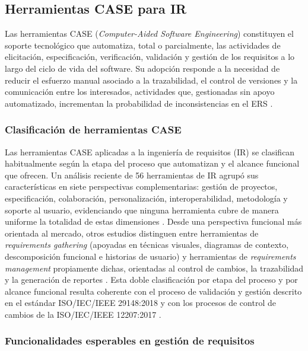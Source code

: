 \documentclass[journal,onecolumn]{IEEEtran}
\begin{document}
	\subsection{Herramientas CASE para IR}
	
	Las herramientas CASE (\textit{Computer-Aided Software Engineering}) constituyen el soporte tecnológico que automatiza, total o parcialmente, las actividades de elicitación, especificación, verificación, validación y gestión de los requisitos a lo largo del ciclo de vida del software. Su adopción responde a la necesidad de reducir el esfuerzo manual asociado a la trazabilidad, el control de versiones y la comunicación entre los interesados, actividades que, gestionadas sin apoyo automatizado, incrementan la probabilidad de inconsistencias en el ERS \cite{ISO29148-2018}.
	
	\subsubsection{Clasificación de herramientas CASE}
	
	Las herramientas CASE aplicadas a la ingeniería de requisitos (IR) se clasifican habitualmente según la etapa del proceso que automatizan y el alcance funcional que ofrecen. Un análisis reciente de 56 herramientas de IR agrupó sus características en siete perspectivas complementarias: gestión de proyectos, especificación, colaboración, personalización, interoperabilidad, metodología y soporte al usuario, evidenciando que ninguna herramienta cubre de manera uniforme la totalidad de estas dimensiones \cite{Ozkaya2023}. Desde una perspectiva funcional más orientada al mercado, otros estudios distinguen entre herramientas de \textit{requirements gathering} (apoyadas en técnicas visuales, diagramas de contexto, descomposición funcional e historias de usuario) y herramientas de \textit{requirements management} propiamente dichas, orientadas al control de cambios, la trazabilidad y la generación de reportes \cite{Nadeem2022}. Esta doble clasificación por etapa del proceso y por alcance funcional resulta coherente con el proceso de validación y gestión descrito en el estándar ISO/IEC/IEEE 29148:2018 y con los procesos de control de cambios de la ISO/IEC/IEEE 12207:2017 \cite{ISO29148-2018, ISO12207-2017}.
	
	\subsubsection{Funcionalidades esperables en gestión de requisitos}
	
\end{document}
